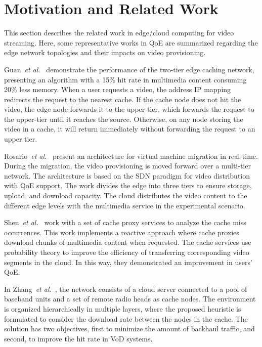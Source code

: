 \section{Motivation and Related Work}
\label{sec:related-work}

This section describes the related work in edge/cloud computing for video streaming. Here, some representative works in QoE are summarized regarding the edge network topologies and their impacts on video provisioning.

Guan~\textit{et al.}~\cite{guan:2019:CLC} demonstrate the performance of the two-tier edge caching network, presenting an algorithm with a 15\% hit rate in multimedia content consuming 20\% less memory. When a user requests a video, the address IP mapping redirects the request to the nearest cache. If the cache node does not hit the video, the edge node forwards it to the upper tier, which forwards the request to the upper-tier until it reaches the source. Otherwise, on any node storing the video in a cache, it will return immediately without forwarding the request to an upper tier.

Rosario~\textit{et al.}~\cite{rosarioSENSORS2018} present an architecture for virtual machine migration in real-time. During the migration, the video provisioning is moved forward over a multi-tier network. The architecture is based on the SDN paradigm for video distribution with QoE support. The work divides the edge into three tiers to ensure storage, upload, and download capacity. The cloud distributes the video content to the different edge levels with the multimedia service in the experimental scenario.

Shen~\textit{et al.}~\cite{shenIWQoS19} work with a set of cache proxy services to analyze the cache miss occurrences. This work implements a reactive approach where cache proxies download chunks of multimedia content when requested. The cache services use probability theory to improve the efficiency of transferring corresponding video segments in the cloud. In this way, they demonstrated an improvement in users' QoE.

In Zhang~\textit{et al.}~\cite{zhang:WCNC2017}, the network consists of a cloud server connected to a pool of baseband units and a set of remote radio heads as cache nodes. The environment is organized hierarchically in multiple layers, where the proposed heuristic is formulated to consider the download rate between the nodes in the cache. The solution has two objectives, first to minimize the amount of backhaul traffic, and second, to improve the hit rate in VoD systems.

